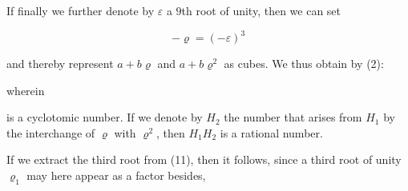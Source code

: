 If finally we further denote by $\varepsilon$ a $9$th root of unity, then we can
set

\[
-\varrho = (-\varepsilon)^3
\]

and thereby represent $a+b\varrho$ and $a+b\varrho^2$ as cubes. We thus
obtain by (2):


wherein


is a cyclotomic number. If we denote by $H_2$ the number that arises from
$H_1$ by the interchange of $\varrho$ with $\varrho^2$, then $H_1 H_2$ is a
rational number.

If we extract the third root from (11), then it follows, since a third root of
unity $\varrho_1$ may here appear as a factor besides,

